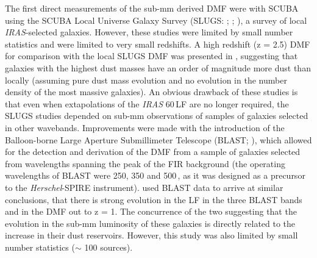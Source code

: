 The first direct measurements of the sub-mm derived DMF were with SCUBA using the SCUBA Local Universe Galaxy Survey (SLUGS: \citealt{Dunne_2000}; \citealt{Dunne_2001}; \citealt{Vlahakis_2005}), a survey of local \textit{IRAS}-selected galaxies. However, these studies were limited by small number statistics and were limited to very small redshifts. A high redshift (z = 2.5) DMF for comparison with the local SLUGS DMF was presented in \citealt{Dunne_2003}, suggesting that galaxies with the highest dust masses have an order of magnitude more dust than locally (assuming pure dust mass evolution and no evolution in the number density of the most massive galaxies). An obvious drawback of these studies is that even when extapolations of the \textit{IRAS} 60\,\micron LF are no longer required, the SLUGS studies depended on sub-mm observations of samples of galaxies selected in other wavebands. Improvements were made with the introduction of the Balloon-borne Large Aperture Submillimeter Telescope (BLAST; \citealt{Devlin_2009}), which allowed for the detection and derivation of the DMF from a sample of galaxies selected from wavelengths spanning the peak of the FIR background (the operating wavelengths of BLAST were 250, 350 and 500\,\micron, as it was designed as a precursor to the \textit{Herschel}-SPIRE instrument). \citealt{Eales_2009} used BLAST data to arrive at similar conclusions, that there is strong evolution in the LF in the three BLAST bands and in the DMF out to z = 1. The concurrence of the two suggesting that the evolution in the sub-mm luminosity of these galaxies is directly related to the increase in their dust reservoirs. However, this study was also limited by small number statistics ($\sim$ 100 sources).

